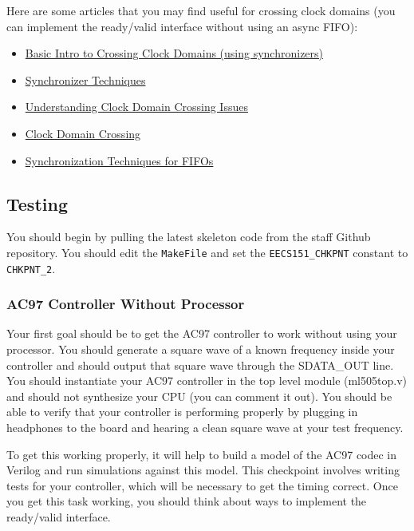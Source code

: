 \documentclass[11pt]{article}
\begin{document}
Here are some articles that you may find useful for crossing clock domains (you can implement the ready/valid interface without using an async FIFO):
\begin{itemize}
	\item \href{http://www.asic-world.com/tidbits/clock_domain.html}{Basic Intro to Crossing Clock Domains (using synchronizers)}
	\item \href{http://www.edn.com/electronics-blogs/day-in-the-life-of-a-chip-designer/4435339/Synchronizer-techniques-for-multi-clock-domain-SoCs}{Synchronizer Techniques}
	\item \href{http://www.eetimes.com/document.asp?doc_id=1279906}{Understanding Clock Domain Crossing Issues}
	\item \href{https://filebox.ece.vt.edu/~athanas/4514/ledadoc/html/pol_cdc.html}{Clock Domain Crossing}
	\item \href{http://www.eng.utah.edu/~kstevens/6770/reports/09-fifo-synchronization.pdf}{Synchronization Techniques for FIFOs}
\end{itemize}

\subsection{Testing}
You should begin by pulling the latest skeleton code from the staff Github repository. You should edit the \verb|MakeFile| and set the \verb|EECS151_CHKPNT| constant to \verb|CHKPNT_2|.

\subsubsection{AC97 Controller Without Processor}
Your first goal should be to get the AC97 controller to work without using your processor. You should generate a square wave of a known frequency inside your controller and should output that square wave through the SDATA\_OUT line. You should instantiate your AC97 controller in the top level module (ml505top.v) and should not synthesize your CPU (you can comment it out). You should be able to verify that your controller is performing properly by plugging in headphones to the board and hearing a clean square wave at your test frequency.

To get this working properly, it will help to build a model of the AC97 codec in Verilog and run simulations against this model. This checkpoint involves writing tests for your controller, which will be necessary to get the timing correct. Once you get this task working, you should think about ways to implement the ready/valid interface.
\end{document}
